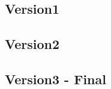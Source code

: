 \subsection{Version1}\label{subsec:version1}

\subsection{Version2}\label{subsec:version2}

\subsection{Version3 - Final}\label{subsec:version3---final}